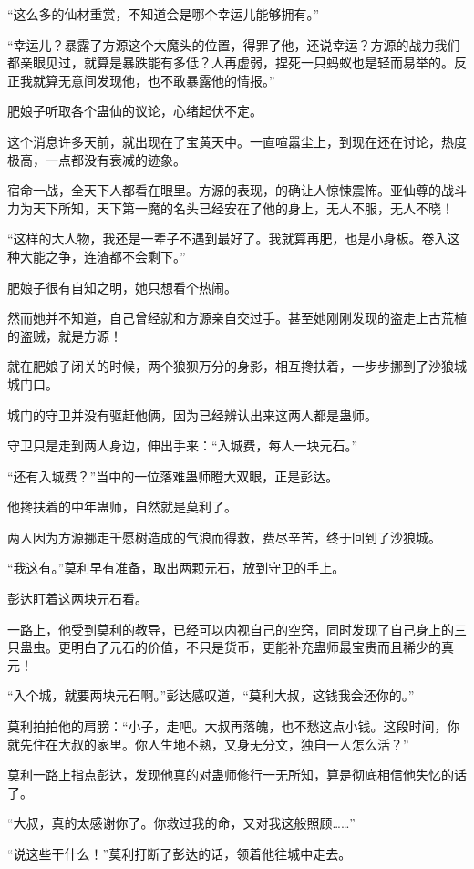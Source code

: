 \begin{this_body}
“这么多的仙材重赏，不知道会是哪个幸运儿能够拥有。”

“幸运儿？暴露了方源这个大魔头的位置，得罪了他，还说幸运？方源的战力我们都亲眼见过，就算是暴跌能有多低？人再虚弱，捏死一只蚂蚁也是轻而易举的。反正我就算无意间发现他，也不敢暴露他的情报。”

肥娘子听取各个蛊仙的议论，心绪起伏不定。

这个消息许多天前，就出现在了宝黄天中。一直喧嚣尘上，到现在还在讨论，热度极高，一点都没有衰减的迹象。

宿命一战，全天下人都看在眼里。方源的表现，的确让人惊悚震怖。亚仙尊的战斗力为天下所知，天下第一魔的名头已经安在了他的身上，无人不服，无人不晓！

“这样的大人物，我还是一辈子不遇到最好了。我就算再肥，也是小身板。卷入这种大能之争，连渣都不会剩下。”

肥娘子很有自知之明，她只想看个热闹。

然而她并不知道，自己曾经就和方源亲自交过手。甚至她刚刚发现的盗走上古荒植的盗贼，就是方源！

就在肥娘子闭关的时候，两个狼狈万分的身影，相互搀扶着，一步步挪到了沙狼城城门口。

城门的守卫并没有驱赶他俩，因为已经辨认出来这两人都是蛊师。

守卫只是走到两人身边，伸出手来：“入城费，每人一块元石。”

“还有入城费？”当中的一位落难蛊师瞪大双眼，正是彭达。

他搀扶着的中年蛊师，自然就是莫利了。

两人因为方源挪走千愿树造成的气浪而得救，费尽辛苦，终于回到了沙狼城。

“我这有。”莫利早有准备，取出两颗元石，放到守卫的手上。

彭达盯着这两块元石看。

一路上，他受到莫利的教导，已经可以内视自己的空窍，同时发现了自己身上的三只蛊虫。更明白了元石的价值，不只是货币，更能补充蛊师最宝贵而且稀少的真元！

“入个城，就要两块元石啊。”彭达感叹道，“莫利大叔，这钱我会还你的。”

莫利拍拍他的肩膀：“小子，走吧。大叔再落魄，也不愁这点小钱。这段时间，你就先住在大叔的家里。你人生地不熟，又身无分文，独自一人怎么活？”

莫利一路上指点彭达，发现他真的对蛊师修行一无所知，算是彻底相信他失忆的话了。

“大叔，真的太感谢你了。你救过我的命，又对我这般照顾……”

“说这些干什么！”莫利打断了彭达的话，领着他往城中走去。


\end{this_body}
